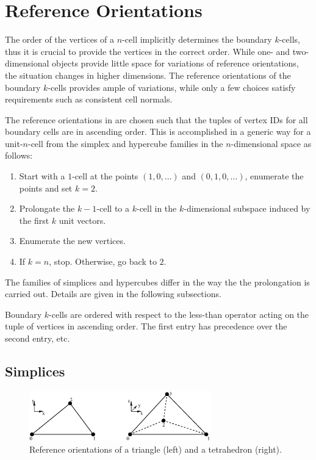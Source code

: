 \chapter{Reference Orientations} \label{chap:orientations}

 

The order of the vertices of a $n$-cell implicitly determines the boundary $k$-cells,
thus it is crucial to provide the vertices in the correct order.
While one- and two-dimensional objects provide little space for variations of reference orientations,
the situation changes in higher dimensions. The reference orientations
of the boundary $k$-cells provides ample of variations, while only a few choices
satisfy requirements such as consistent cell normals.

The reference orientations in {\ViennaGrid} are chosen such that the tuples
of vertex IDs for all boundary cells are in ascending order. This is accomplished
in a generic way for a unit-$n$-cell from the simplex and hypercube families in the $n$-dimensional space as follows:
\begin{enumerate}
 \item Start with a $1$-cell at the points $(1, 0, \ldots)$ and $(0, 1, 0, \ldots)$, enumerate the points and set $k=2$.
 \item Prolongate the $k-1$-cell to a $k$-cell in the $k$-dimensional subspace induced by the first $k$ unit vectors.
 \item Enumerate the new vertices.
 \item If $k=n$, stop. Otherwise, go back to $2$.
\end{enumerate}

The families of simplices and hypercubes differ in the way the the prolongation is carried out.
Details are given in the following subsections.

Boundary $k$-cells are ordered with respect to the less-than operator acting on the tuple of vertices in ascending order.
The first entry has precedence over the second entry, etc.

\section{Simplices}
\begin{figure}[tb]
\centering
 \includegraphics[width=0.7\textwidth]{figures/orientation-simplex.eps}
 \caption{Reference orientations of a triangle (left) and a tetrahedron (right).}
 \label{fig:orientation-simplex}
\end{figure}

